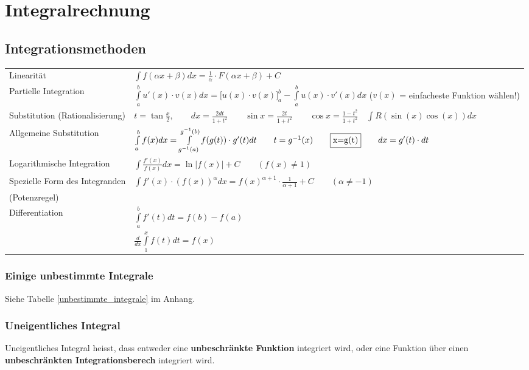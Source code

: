 \section{Integralrechnung }
\subsection{Integrationsmethoden }
  
  \begin{tabular}{ll}
    Linearit\"at & $\int{f(\alpha x+\beta )dx=\frac{1}{\alpha}\cdot F(\alpha x+\beta)+C}$ \\
    Partielle Integration & $\int\limits_a^b{u'(x)\cdot v(x)dx}=\biggl[
    u(x)\cdot v(x) \biggr]_a^b-\int\limits_a^b{u(x)\cdot v'(x)dx}$ 
    ($v(x)$ = einfacheste Funktion wählen!) \\
    Substitution (Rationalisierung) & $t=\tan\frac{x}{2}, \qquad
    dx=\frac{2dt}{1+t^2} \qquad \sin  x=\frac{2t}{1+t^2} \qquad \cos x=\frac{1-t^2}{1+t^2}
    \quad\int{R(\sin(x)\cos(x))dx}$\\
    Allgemeine Substitution &
    $\int\limits_{a}^{b}{f(x)dx}=\int\limits_{g^{-1}(a)}^{g^{-1}(b)}{f(g(t))\cdot
    g'(t)dt}\qquad t=g^{-1}(x)\qquad  \fbox{x=g(t)}\qquad dx=g'(t)\cdot dt$\\
    Logarithmische Integration & $\int{\frac{f'(x)}{f(x)}dx}=\ln|f(x)|+C 
    \qquad{(f(x)\neq 1)}$\\
    Spezielle Form des Integranden & $\int{f'(x)\cdot
    (f(x))^{\alpha} dx}= f(x)^{\alpha +1}\cdot \frac{1}{\alpha+1}+C
    \qquad{(\alpha \neq -1)}$\\
    (Potenzregel) & \\
    Differentiation & $\int \limits ^{b} _{a} {f'(t)dt}=f(b)-f(a)$\\
    & $\frac{d}{dx} \int \limits ^{x} _{1} {f(t)dt}=f(x)$
  \end{tabular}
  

\subsubsection{Einige unbestimmte Integrale }
Siehe Tabelle \ref{unbestimmte_integrale} im Anhang. \\

\subsubsection{Uneigentliches Integral }
  Uneigentliches Integral heisst, dass entweder eine \textbf{unbeschr\"ankte
  Funktion} integriert wird, oder eine Funktion \"uber einen
  \textbf{unbeschr\"ankten Integrationsberech} integriert wird.\\

